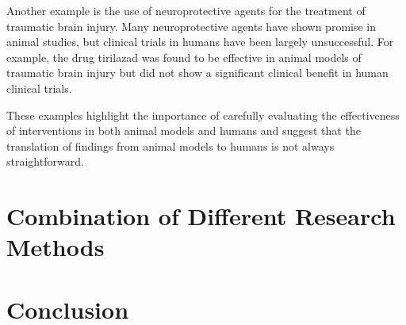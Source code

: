 \documentclass[10pt]{article}
\begin{document}
\begin{sloppypar}
  Another example is the use of neuroprotective agents for the treatment of traumatic brain injury. Many neuroprotective agents have shown promise in animal studies, but clinical trials in humans have been largely unsuccessful. For example, the drug tirilazad was found to be effective in animal models of traumatic brain injury but did not show a significant clinical benefit in human clinical trials.

  These examples highlight the importance of carefully evaluating the effectiveness of interventions in both animal models and humans and suggest that the translation of findings from animal models to humans is not always straightforward.

  \section{Combination of Different Research Methods}
  \label{sec:discussion}

  \section{Conclusion}
  \label{sec:conclusion}

  \pagebreak
  
  

\end{sloppypar}
\end{document}
